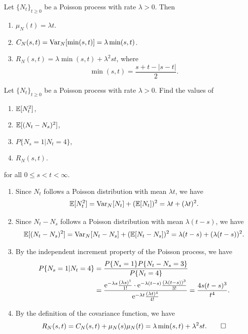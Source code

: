\begin{proposition}
  Let \(\{N_t\}_{t \geq 0}\) be a Poisson process with rate \(\lambda > 0\). Then
  \begin{enumerate}
    \item \(\mu_N(t) = \lambda t\).
    \item \(C_N(s, t) = \mathrm{Var}_N[\min(s, t)] = \lambda \min(s, t)\).
    \item \(R_N(s, t) = \lambda \min(s, t) + \lambda^2 s t\), where
    \[
      \min(s, t) = \frac{s + t - |s - t|}{2}.
    \]
  \end{enumerate}
\end{proposition}

\begin{example}
  Let \(\{N_t\}_{t \geq 0}\) be a Poisson process with rate \(\lambda > 0\). Find the values of
  \begin{enumerate}
    \item \(\mathbb{E}[N_t^2]\),
    \item \(\mathbb{E}[(N_t - N_s)^2]\),
    \item \(P\{N_s = 1 | N_t = 4\}\),
    \item \(R_N(s, t)\).
  \end{enumerate}
  for all \(0 \leq s < t < \infty\).
\end{example}
\begin{solution}
  \begin{enumerate}
    \item Since \(N_t\) follows a Poisson distribution with mean \(\lambda t\), we have
    \[
      \mathbb{E}[N_t^2] = \mathrm{Var}_N[N_t] + (\mathbb{E}[N_t])^2 = \lambda t + (\lambda t)^2.
    \]
    \item Since \(N_t - N_s\) follows a Poisson distribution with mean \(\lambda (t - s)\), we have
    \[
      \mathbb{E}[(N_t - N_s)^2] = \mathrm{Var}_N[N_t - N_s] + (\mathbb{E}[N_t - N_s])^2 = \lambda (t - s) + (\lambda (t - s))^2.
    \]
    \item By the independent increment property of the Poisson process, we have
    \begin{align*}
      P\{N_s = 1 | N_t = 4\} &= \frac{P\{N_s = 1\} P\{N_t - N_s = 3\}}{P\{N_t = 4\}} \\
      &= \frac{\mathrm{e}^{-\lambda s} \frac{(\lambda s)^1}{1!} \cdot \mathrm{e}^{-\lambda (t - s)} \frac{(\lambda (t - s))^3}{3!}}{\mathrm{e}^{-\lambda t} \frac{(\lambda t)^4}{4!}} = \frac{4s(t - s)^3}{t^4}.
    \end{align*}
    \item By the definition of the covariance function, we have
    \[
      R_N(s, t) = C_N(s, t) + \mu_N(s) \mu_N(t) = \lambda \min(s, t) + \lambda^2 s t. \qedhere
    \]
  \end{enumerate}
\end{solution}

